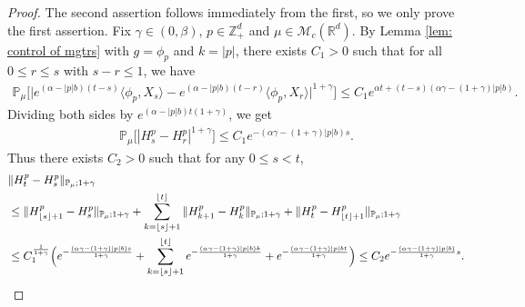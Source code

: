 \documentclass[12pt,a4paper]{amsart}
\theoremstyle{plain}
\theoremstyle{definition}
\numberwithin{equation}{section}
\begin{document}
\begin{proof}
    The second assertion follows immediately from the first, so we only prove the first assertion.
    Fix $\gamma \in (0,\beta)$, $p\in \mathbb{Z}_+^d$ and $\mu\in \mathcal M_c(\mathbb R^d)$.
    By Lemma \ref{lem: control of mgtrs} with $g=\phi_p$ and $k=|p|$, there exists $C_1>0$ such that for all $0\leq r\leq s $ with $s-r\leq1$, we have
\begin{align}
    \mathbb{P}_{\mu}\Big[\big|e^{(\alpha-|p|b)(t-s)}\langle\phi_p, X_s\rangle-e^{(\alpha-|p|b)(t-r)}\langle\phi_p, X_r\rangle\big|^{1+\gamma}\Big]
    \leq C_1e^{\alpha t+(t-s)(\alpha\gamma-(1+\gamma)|p|b)}.
\end{align}
    Dividing both sides by $e^{(\alpha-|p|b) t(1+\gamma)}$, we get
\begin{align}
    \mathbb{P}_{\mu}\big[|H^p_s-H^p_r|^{1+\gamma}\big]
    \leq  C_1 e^{-(\alpha\gamma-(1+\gamma)|p|b)s}.
\end{align}
    Thus there exists $C_2>0$ such that for any $0\leq s<t$,
\begin{align}
	& \|H^p_t-H^p_s\|_{\mathbb{P}_{\mu};1+\gamma}
	\\&\leq \|H^p_{\lfloor s \rfloor+1}-H^p_s\|_{\mathbb{P}_{\mu};1+\gamma}+\sum_{k=\lfloor s \rfloor+1}^{\lfloor t \rfloor}\|H^p_{k+1}-H^p_{k}\|_{\mathbb{P}_{\mu};1+\gamma}+\|H^p_t-H^p_{\lfloor t \rfloor+1}\|_{\mathbb{P}_{\mu};1+\gamma}
	\\& \leq C_1^{\frac{1}{1+\gamma}} \Big(e^{-\frac{(\alpha \gamma-(1+\gamma)|p|b) s}{1+\gamma}}+\sum_{k=\lfloor s \rfloor+1}^{\lfloor t \rfloor}e^{-\frac{(\alpha \gamma-(1+\gamma)|p|b) k}{1+\gamma}}+ e^{-\frac{(\alpha \gamma-(1+\gamma)|p|b t}{1+\gamma}}\Big)
	\leq C_2e^{-\frac{(\alpha \gamma-(1+\gamma)|p|b)}{1+\gamma}s}.
    \qedhere
\end{align}	
\end{proof}
\end{document}
